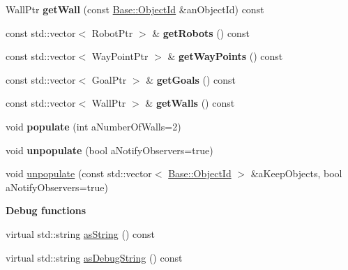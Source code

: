 \begin{DoxyCompactItemize}
\item 
Wall\+Ptr {\bfseries get\+Wall} (const \hyperlink{class_base_1_1_object_id}{Base\+::\+Object\+Id} \&an\+Object\+Id) const \hypertarget{class_model_1_1_robot_world_a8d6dab46a8c89a42f101f4548e4b3da6}{}\label{class_model_1_1_robot_world_a8d6dab46a8c89a42f101f4548e4b3da6}

\item 
const std\+::vector$<$ Robot\+Ptr $>$ \& {\bfseries get\+Robots} () const \hypertarget{class_model_1_1_robot_world_a657cbe460deb2057521ae51dc5327fe7}{}\label{class_model_1_1_robot_world_a657cbe460deb2057521ae51dc5327fe7}

\item 
const std\+::vector$<$ Way\+Point\+Ptr $>$ \& {\bfseries get\+Way\+Points} () const \hypertarget{class_model_1_1_robot_world_a1bbc183d9e63ae142bcbc0373aa06e78}{}\label{class_model_1_1_robot_world_a1bbc183d9e63ae142bcbc0373aa06e78}

\item 
const std\+::vector$<$ Goal\+Ptr $>$ \& {\bfseries get\+Goals} () const \hypertarget{class_model_1_1_robot_world_a6bac601255c803cc88cc145da2aa1ff0}{}\label{class_model_1_1_robot_world_a6bac601255c803cc88cc145da2aa1ff0}

\item 
const std\+::vector$<$ Wall\+Ptr $>$ \& {\bfseries get\+Walls} () const \hypertarget{class_model_1_1_robot_world_a6751f9fe7b9e33047a6d518f5a2f819b}{}\label{class_model_1_1_robot_world_a6751f9fe7b9e33047a6d518f5a2f819b}

\item 
void {\bfseries populate} (int a\+Number\+Of\+Walls=2)\hypertarget{class_model_1_1_robot_world_afe09ff15bf8a4cbed1222baa065107d9}{}\label{class_model_1_1_robot_world_afe09ff15bf8a4cbed1222baa065107d9}

\item 
void {\bfseries unpopulate} (bool a\+Notify\+Observers=true)\hypertarget{class_model_1_1_robot_world_aa54ca5337df73d34be09a2c3b9a66c37}{}\label{class_model_1_1_robot_world_aa54ca5337df73d34be09a2c3b9a66c37}

\item 
void \hyperlink{class_model_1_1_robot_world_a4a62b951e0cdab0ce60f0189442481f8}{unpopulate} (const std\+::vector$<$ \hyperlink{class_base_1_1_object_id}{Base\+::\+Object\+Id} $>$ \&a\+Keep\+Objects, bool a\+Notify\+Observers=true)
\end{DoxyCompactItemize}
\begin{Indent}{\bf Debug functions}\par
\begin{DoxyCompactItemize}
\item 
virtual std\+::string \hyperlink{class_model_1_1_robot_world_a9f5a599b9d6523f45df7cbb0aafe4c08}{as\+String} () const 
\item 
virtual std\+::string \hyperlink{class_model_1_1_robot_world_a9c599037d4bdc7ebd4e9138c3cf3cc82}{as\+Debug\+String} () const 
\end{DoxyCompactItemize}
\end{Indent}
